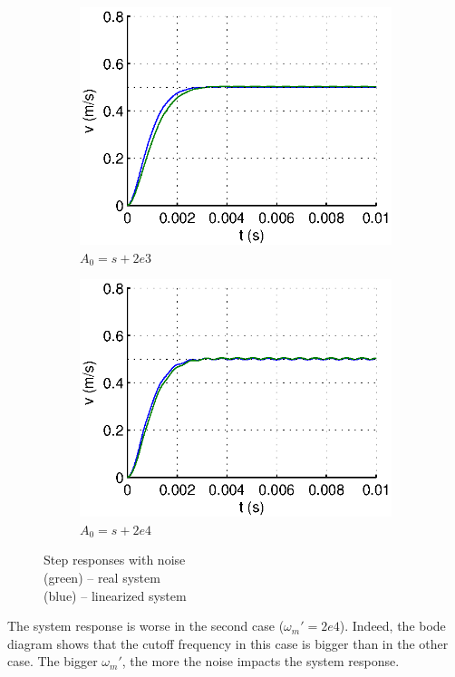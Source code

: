 \begin{figure}[hb]
  \centering
  \begin{subfigure}[b]{\linewidth}
   \includegraphics[width=\columnwidth]{fig/step_wm_noise.eps}
   \caption{$A_0 = s+2e3$}
  \end{subfigure}
  \begin{subfigure}[b]{\linewidth}
  \includegraphics[width=\columnwidth]{fig/step_10wm_noise.eps}
   \caption{$A_0 = s + 2e4$}
  \end{subfigure}
 \caption{Step responses with noise \\ (green) -- real system \\ (blue) -- linearized system}
 \label{noise}
\end{figure}


The system response is worse in the second case ($\omega_m' = 2e4$). Indeed, the bode diagram shows that the cutoff frequency in this case is bigger than in the other case. The bigger $\omega_m'$, the more the noise impacts the system response.




